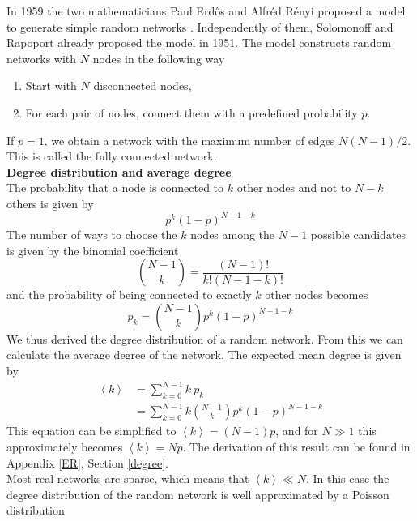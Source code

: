 \documentclass[11 pt , letterpaper , twoside , openright]{book}
\begin{document}
In 1959 the two mathematicians Paul Erd\H{o}s and Alfr\'{e}d R\'{e}nyi proposed a model to generate simple random networks \cite{F.Costa2007}. Independently of them, Solomonoff and Rapoport already proposed the model in 1951. The model constructs random networks with $N$ nodes in the following way \cite{Albert2002}
\begin{enumerate}
	\item Start with $N$ disconnected nodes,
	\item For each pair of nodes, connect them with a predefined probability $p$.
\end{enumerate} 
If $p=1$, we obtain a network with the maximum number of edges $N(N-1)/2$. This is called the fully connected network.\\
\newline
\textbf{Degree distribution and average degree}\\
\newline
The probability that a node is connected to $k$ other nodes and not to $N-k$ others is given by
\begin{equation}
	p^k (1-p)^{N-1-k}
\end{equation}
The number of ways to choose the $k$ nodes among the $N-1$ possible candidates is given by the binomial coefficient
\begin{equation}
	\binom{N-1}{k} = \frac{(N-1)!}{k!(N-1-k)!}
\end{equation}
and the probability of being connected to exactly $k$ other nodes becomes
\begin{equation}\label{degDistRan}
	p_k = \binom{N-1}{k}p^k (1-p)^{N-1-k}
\end{equation}
We thus derived the degree distribution of a random network. From this we can calculate the average degree of the network. The expected mean degree is given by \cite{Hopcroft2006}
\begin{equation}\label{avDeg}
\begin{split}
	\left<k\right> &= \sum_{k=0}^{N-1} k\  p_k  \\
&= \sum_{k=0}^{N-1} k \binom{N-1}{k}p^k (1-p)^{N-1-k}
\end{split}
\end{equation}
This equation can be simplified to $\left<k\right> = (N-1)p$, and for $N \gg 1$ this approximately becomes $\left<k\right> = Np$. The derivation of this result can be found in Appendix \ref{ER}, Section \ref{degree}.\\
Most real networks are sparse, which means that $\left<k\right> \ll N$. In this case the degree distribution of the random network is well approximated by a Poisson distribution \cite{Albert2014} 
\end{document}
